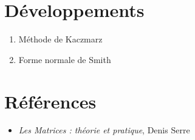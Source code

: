 \documentclass[11pt,a4paper,twocolumn]{article}
\theoremstyle{definition}
\newcounter{n}
\begin{document}
\section*{Développements}

\begin{enumerate}
\item Méthode de Kaczmarz
\item Forme normale de Smith
\end{enumerate}

\section*{Références}

\begin{itemize}
\item \emph{Les Matrices : théorie et pratique}, Denis Serre
\end{itemize}
\end{document}
